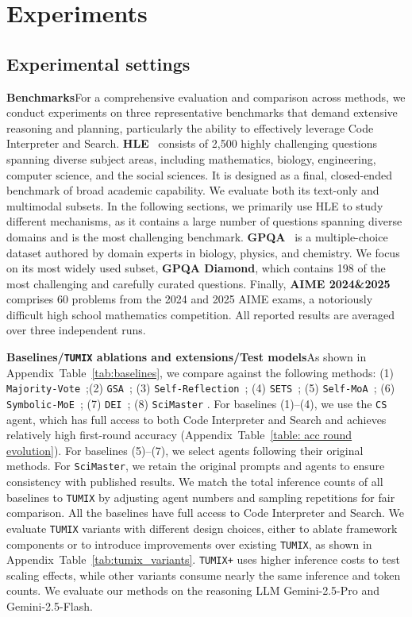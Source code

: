 \section{Experiments}
\subsection{Experimental settings}
\textbf{Benchmarks}\quad For a comprehensive evaluation and comparison across methods, we conduct experiments on three representative benchmarks that demand extensive reasoning and planning, particularly the ability to effectively leverage Code Interpreter and Search. \textbf{HLE}~\citep{HLE} consists of 2,500 highly challenging questions spanning diverse subject areas, including mathematics, biology, engineering, computer science, and the social sciences. It is designed as a final, closed-ended benchmark of broad academic capability. We evaluate both its text-only and multimodal subsets. In the following sections, we primarily use HLE to study different mechanisms, as it contains a large number of questions spanning diverse domains and is the most challenging benchmark. \textbf{GPQA}~\citep{gpqa} is a multiple-choice dataset authored by domain experts in biology, physics, and chemistry. We focus on its most widely used subset, \textbf{GPQA Diamond}, which contains 198 of the most challenging and carefully curated questions. Finally, \textbf{AIME 2024\&2025} comprises 60 problems from the 2024 and 2025 AIME exams, a notoriously difficult high school mathematics competition. All reported results are averaged over three independent runs.

\textbf{Baselines/\texttt{TUMIX} ablations and extensions/Test models}\quad As shown in Appendix~Table~\ref{tab:baselines}, we compare against the following methods:  
(1) \texttt{Majority-Vote}~\citep{LLM-monkey};(2) \texttt{GSA}~\citep{GSA:Llms-aggregating-own-responses}; (3) \texttt{Self-Reflection}~\citep{self-reflection}; (4) \texttt{SETS}~\citep{chen2025sets}; (5) \texttt{Self-MoA}~\citep{rethink-MOA}; (6) \texttt{Symbolic-MoE}~\citep{symbolic-MOE}; (7) \texttt{DEI}~\citep{DEI}; (8) \texttt{SciMaster} \citep{chai2025scimaster}. For baselines (1)–(4), we use the \texttt{CS} agent, which has full access to both Code Interpreter and Search and achieves relatively high first-round accuracy (Appendix~Table~\ref{table: acc round evolution}). For baselines (5)–(7), we select agents following their original methods. For \texttt{SciMaster}, we retain the original prompts and agents to ensure consistency with published results. We match the total inference counts of all baselines to \texttt{TUMIX} by adjusting agent numbers and sampling repetitions for fair comparison. All the baselines have full access to Code Interpreter and Search. We evaluate \texttt{TUMIX} variants with different design choices, either to ablate framework components or to introduce improvements over existing \texttt{TUMIX}, as shown in Appendix~Table~\ref{tab:tumix_variants}. \texttt{TUMIX+} uses higher inference costs to test scaling effects, while other variants consume nearly the same inference and token counts. We evaluate our methods on the reasoning LLM Gemini-2.5-Pro and Gemini-2.5-Flash.

